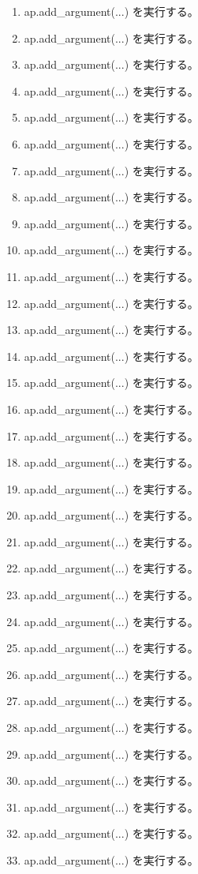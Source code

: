 \documentclass[a4paper,11pt]{article}
\begin{document}
\begin{enumerate}[leftmargin=1.8em]
\item ap.add\_argument(...) を実行する。
\item ap.add\_argument(...) を実行する。
\item ap.add\_argument(...) を実行する。
\item ap.add\_argument(...) を実行する。
\item ap.add\_argument(...) を実行する。
\item ap.add\_argument(...) を実行する。
\item ap.add\_argument(...) を実行する。
\item ap.add\_argument(...) を実行する。
\item ap.add\_argument(...) を実行する。
\item ap.add\_argument(...) を実行する。
\item ap.add\_argument(...) を実行する。
\item ap.add\_argument(...) を実行する。
\item ap.add\_argument(...) を実行する。
\item ap.add\_argument(...) を実行する。
\item ap.add\_argument(...) を実行する。
\item ap.add\_argument(...) を実行する。
\item ap.add\_argument(...) を実行する。
\item ap.add\_argument(...) を実行する。
\item ap.add\_argument(...) を実行する。
\item ap.add\_argument(...) を実行する。
\item ap.add\_argument(...) を実行する。
\item ap.add\_argument(...) を実行する。
\item ap.add\_argument(...) を実行する。
\item ap.add\_argument(...) を実行する。
\item ap.add\_argument(...) を実行する。
\item ap.add\_argument(...) を実行する。
\item ap.add\_argument(...) を実行する。
\item ap.add\_argument(...) を実行する。
\item ap.add\_argument(...) を実行する。
\item ap.add\_argument(...) を実行する。
\item ap.add\_argument(...) を実行する。
\item ap.add\_argument(...) を実行する。
\item ap.add\_argument(...) を実行する。

\end{enumerate}
\end{document}
